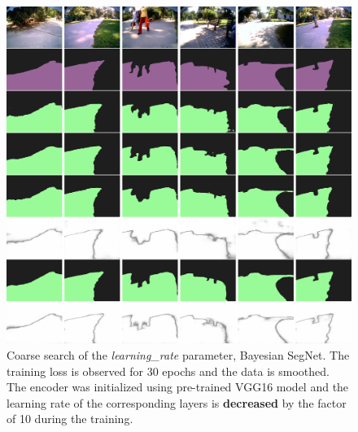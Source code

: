 \begin{figure}[h]
	\begin{center}
		\includegraphics*[width=16cm, keepaspectratio]{obr/result.png}
	\end{center}
	\vspace{5mm}
	\caption{Coarse search of the \textit{learning\_rate} parameter, Bayesian SegNet. The training loss is observed for 30 epochs and the data is smoothed. The encoder was initialized using pre-trained VGG16 model and the learning rate of the corresponding layers is \textbf{decreased} by the factor of 10 during the training.} 
	\label{}
\end{figure}
